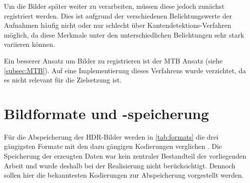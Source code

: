 Um die Bilder später weiter zu verarbeiten, müssen diese jedoch zunächst registriert werden. Dies ist aufgrund der verschiedenen Belichtungswerte der Aufnahmen häufig nicht oder nur schlecht über Kantendetektions-Verfahren möglich, da diese Merkmale unter den unterschiedlichen Belichtungen sehr stark variieren können.

Ein besserer Ansatz um Bilder zu registrieren ist der \gls{MTB} Ansatz (siehe \autoref{subsec:MTB}). Auf eine Implementierung dieses Verfahrens wurde verzichtet, da es nicht relevant für die Zielsetzung ist.

\section{Bildformate und -speicherung}

Für die Abspeicherung der \gls{HDR}-Bilder werden in \autoref{tab:formats} die drei gängigsten Formate mit den dazu gängigen Kodierungen verglichen \cite[S.~89]{Reinhard}. Die Speicherung der erzeugten Daten war kein zentraler Bestandteil der vorliegenden Arbeit und wurde deshalb bei der Realisierung nicht berücksichtigt. Dennoch sollen hier die bekanntesten Kodierungen zur Abspeicherung vorgestellt werden.


